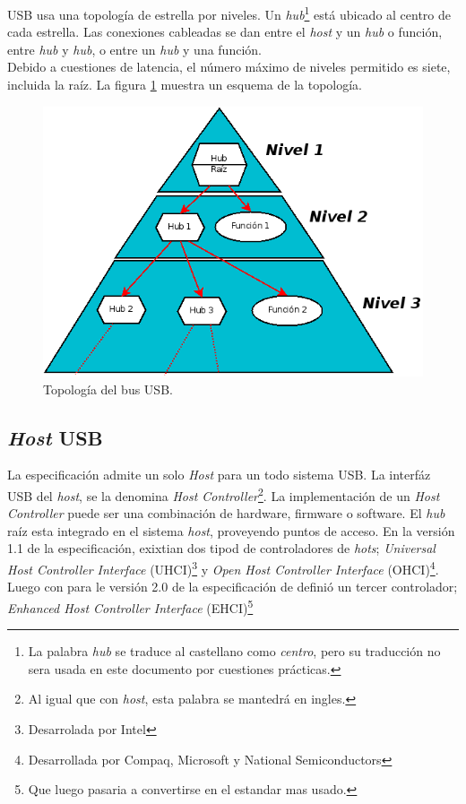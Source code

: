 USB usa una topolog\'ia de estrella por niveles. Un \emph{hub}\footnote{La
palabra \emph{hub} se traduce al castellano como \emph{centro}, pero su
traducci\'on no sera usada en este documento por cuestiones pr\'acticas.}
est\'a ubicado al centro de cada estrella. Las conexiones cableadas se dan
entre el \emph{host} y un \emph{hub} o funci\'on, entre \emph{hub} y
\emph{hub}, o entre un \emph{hub} y una funci\'on. \\

Debido a cuestiones de latencia, el n\'umero m\'aximo de niveles permitido es
siete, incluida la ra\'iz. La figura \ref{fig:usb_topology} muestra un esquema
de la topolog\'ia.

\begin{figure}
\centering
\includegraphics[scale=0.5]{./img/usb_topology.png}
\caption{Topolog\'ia del bus USB.}
\label{fig:usb_topology}
\end{figure}

\subsection{\emph{Host} USB}

La especificaci\'on admite un solo \emph{Host} para un todo sistema USB. La
interf\'az USB del \emph{host}, se la denomina \emph{Host
Controller}\footnote{Al igual que con \emph{host}, esta palabra se mantedr\'a
en ingles.}. La implementaci\'on de un \emph{Host Controller} puede ser una
combinaci\'on de hardware, firmware o software. El \emph{hub} ra\'iz esta
integrado en el sistema \emph{host}, proveyendo puntos de acceso.
En la versi\'on 1.1 de la especificaci\'on, exixtian dos tipod de
controladores de \emph{hots}; \emph{Universal Host Controller Interface}
(UHCI)\footnote{Desarrolada por Intel} y \emph{Open Host Controller Interface}
(OHCI)\footnote{Desarrollada por Compaq, Microsoft y National Semiconductors}.
Luego con para le versi\'on 2.0 de la especificaci\'on de defini\'o un tercer
controlador; \emph{Enhanced Host Controller Interface} (EHCI)\footnote{Que
luego pasaria a convertirse en el estandar mas usado.}

